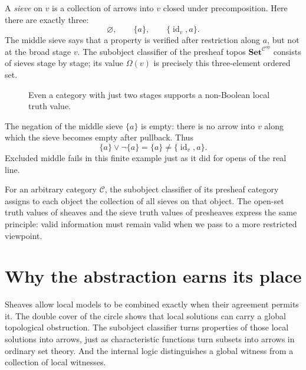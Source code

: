 A \emph{sieve} on \(v\) is a collection of arrows into \(v\) closed under precomposition. Here there are exactly three:
\[
 \boxed{\varnothing,\qquad
 \{a\},\qquad
 \{\operatorname{id}_v,a\}.}
\]
The middle sieve says that a property is verified after restriction along \(a\), but not at the broad stage \(v\). The subobject classifier of the presheaf topos \(\mathbf{Set}^{\mathcal C^{\mathrm{op}}}\) consists of sieves stage by stage; its value \(\Omega(v)\) is precisely this three-element ordered set.

\begin{figure}[H]
\centering
{}
\caption{Even a category with just two stages supports a non-Boolean local truth value.}
\end{figure}

The negation of the middle sieve \(\{a\}\) is empty: there is no arrow into \(v\) along which the sieve becomes empty after pullback. Thus
\[
 \{a\}\vee\neg\{a\}=\{a\}\ne
 \{\operatorname{id}_v,a\}.
\]
Excluded middle fails in this finite example just as it did for opens of the real line.

For an arbitrary category \(\mathcal C\), the subobject classifier of its presheaf category assigns to each object the collection of all sieves on that object. The open-set truth values of sheaves and the sieve truth values of presheaves express the same principle: valid information must remain valid when we pass to a more restricted viewpoint.

\section{Why the abstraction earns its place}

Sheaves allow local models to be combined exactly when their agreement permits it. The double cover of the circle shows that local solutions can carry a global topological obstruction. The subobject classifier turns properties of those local solutions into arrows, just as characteristic functions turn subsets into arrows in ordinary set theory. And the internal logic distinguishes a global witness from a collection of local witnesses.

